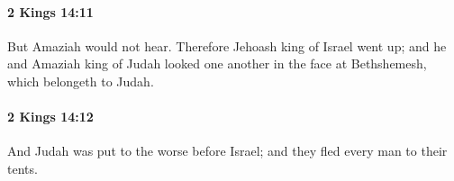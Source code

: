 		\paragraph{2 Kings 14:11} %
			\label{2KINGS-14-11}

			But Amaziah would not hear. Therefore Jehoash king of Israel went up; and he and Amaziah king of Judah looked one another in the face at Bethshemesh, which belongeth to Judah.


		\paragraph{2 Kings 14:12} %
			\label{2KINGS-14-12}

			And Judah was put to the worse before Israel; and they fled every man to their tents.


